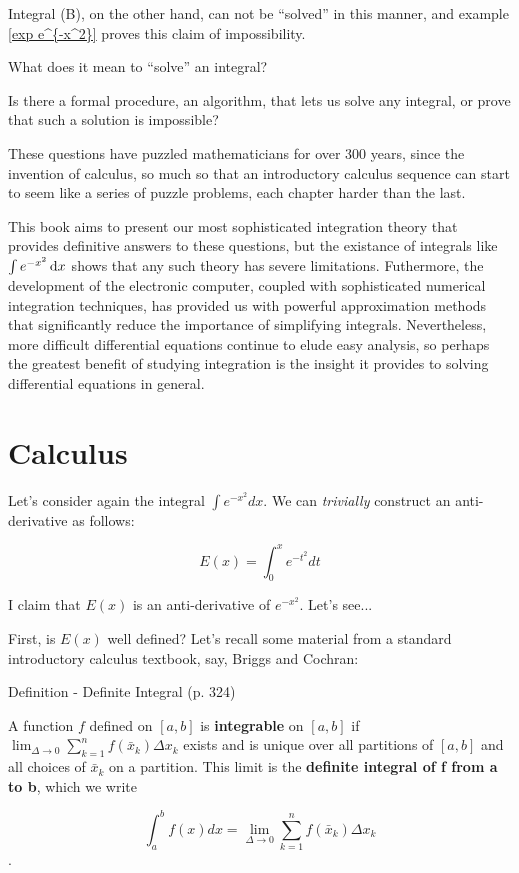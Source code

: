 Integral (B), on the other hand, can not be ``solved'' in
this manner, and example \ref{exp e^{-x^2}} proves this
claim of impossibility.

What does it mean to ``solve'' an integral?

Is there a formal procedure, an algorithm, that lets us solve
any integral, or prove that such a solution is impossible?

These questions have puzzled mathematicians for over 300 years, since
the invention of calculus, so much so that an introductory calculus
sequence can start to seem like a series of puzzle problems, each
chapter harder than the last.

This book aims to present our most sophisticated integration theory
that provides definitive answers to these questions, but the existance
of integrals like $\int e^{-x^2} \,\mathrm{d} x$ shows that any such theory has
severe limitations.  Futhermore, the development of the electronic
computer, coupled with sophisticated numerical integration techniques,
has provided us with powerful approximation methods that significantly
reduce the importance of simplifying integrals.  Nevertheless, more
difficult differential equations continue to elude easy analysis, so
perhaps the greatest benefit of studying integration is the insight it
provides to solving differential equations in general.

\vfill\eject
\section{Calculus}
Let's consider again the integral $\int e^{-x^2} dx$.  We can {\it trivially} construct
an anti-derivative as follows:

$$E(x) = \int_0^x e^{-t^2} dt$$

I claim that $E(x)$ is an anti-derivative of $e^{-x^2}$.  Let's see...

First, is $E(x)$ well defined?  Let's recall some material from a standard
introductory calculus textbook, say, Briggs and Cochran:

\begin{framed}
Definition - Definite Integral (p. 324)

A function $f$ defined on $[a,b]$ is {\bf integrable} on $[a,b]$ if $\lim_{\Delta\to0}\sum_{k=1}^{n}f(\bar{x}_k)\Delta x_k$
exists and is unique over all partitions of $[a,b]$ and all choices of $\bar{x}_k$ on a partition.
This limit is the {\bf definite integral of f from a to b}, which we write

$$\int_a^b f(x) dx = \lim_{\Delta\to0}\sum_{k=1}^{n}f(\bar{x}_k)\Delta x_k $$.
\end{framed}

